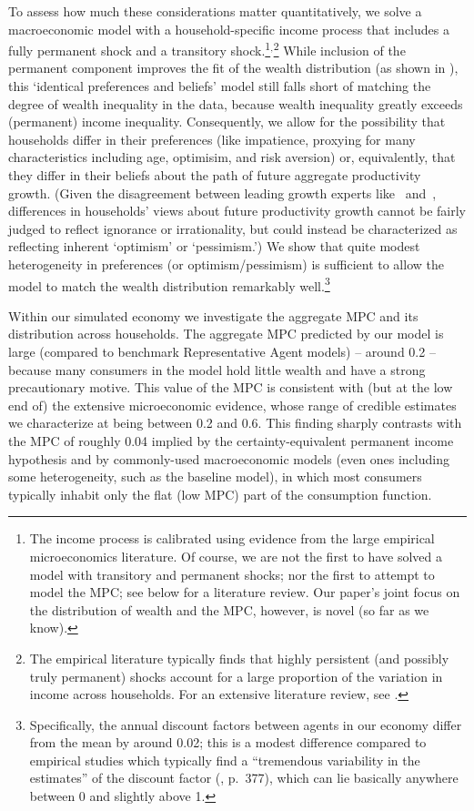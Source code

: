 \documentclass[12pt,titlepage]{econtex}
\begin{document}
To assess how much these considerations matter quantitatively, we
solve a macroeconomic model with a household-specific income process
that includes a fully permanent shock and a transitory
shock.\footnote{The income process is calibrated using evidence from
  the large empirical microeconomics literature.  Of course, we are
  not the first to have solved a model with transitory and permanent
  shocks; nor the first to attempt to model the MPC; see below for a
  literature review.  Our paper's joint focus on the distribution of
  wealth and the MPC, however, is novel (so far as we
  know).}$^{,}$\footnote{The empirical literature typically finds that
  highly persistent (and possibly truly permanent) shocks account for
  a large proportion of the variation in income across households.
  For an extensive literature review, see \cite{cstKS}.} While inclusion of the permanent component improves the fit of the wealth distribution (as shown in \cite{cstKS}), this `identical preferences and beliefs'  model still falls short of matching the degree of wealth inequality in the data, because wealth inequality greatly exceeds (permanent) income inequality. Consequently, we allow for the possibility that households differ in their preferences (like impatience, proxying for many characteristics including age, optimisim, and risk aversion) or, equivalently, that they differ in their beliefs about the path of future aggregate productivity growth.  (Given the disagreement between leading growth experts like~\cite{gordonFutureGrowth} and~\cite{fjFutureGrowth}, differences in households' views about future productivity growth cannot be fairly judged to reflect ignorance or irrationality, but could instead be characterized as reflecting inherent `optimism' or `pessimism.')  We show that quite modest heterogeneity in preferences (or optimism/pessimism) 
 is sufficient to allow the model to match the wealth distribution  remarkably well.\footnote{Specifically, the annual 
  discount factors between agents in our economy differ from the mean by around 0.02; this is a modest difference compared to empirical studies which typically find a ``tremendous variability in the
  estimates'' of the discount factor  (\cite{frederickLoewensteinODonogue:discountReview}, p.\ 377), which can lie basically anywhere between 0 and slightly above 1.}

Within our simulated economy we investigate the aggregate MPC and its distribution across households. The aggregate MPC  predicted by our model is large (compared to benchmark Representative Agent models) -- around 0.2 --  because many consumers in the model hold little wealth and have a strong precautionary motive. This value of the MPC is consistent with (but at the low end of) the extensive microeconomic evidence, whose range of credible estimates we characterize at being between 0.2 and 0.6.  This finding sharply contrasts with the MPC of roughly 0.04 implied by the certainty-equivalent permanent income hypothesis and by commonly-used macroeconomic models (even ones including some heterogeneity, such as the baseline \citet{ksHetero} model), in which most consumers typically inhabit only the flat (low MPC) part of the consumption function.
\end{document}

